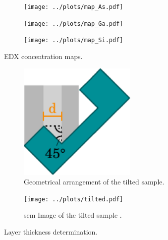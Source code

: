 \begin{figure}[t!]
	\centering
	\begin{subfigure}{0.45\linewidth}
		\centering
		\texttt{[image: ../plots/map\_As.pdf]}
		\caption{ }
		\label{subfig:map_as}
	\end{subfigure}
	\begin{subfigure}{0.45\linewidth}
		\centering
		\texttt{[image: ../plots/map\_Ga.pdf]}
		\caption{ }
		\label{subfig:map_ga}
	\end{subfigure}
	\begin{subfigure}{0.45\linewidth}
		\centering
		\texttt{[image: ../plots/map\_Si.pdf]}
		\caption{ }
		\label{subfig:map_si}
	\end{subfigure}
	\caption{EDX concentration maps.}
	\label{fig:edx_maps}
\end{figure}

\begin{figure}
	\centering
	\begin{subfigure}{0.45\linewidth}
		\centering
		\includegraphics[width=0.625\textwidth]{../assets/angle.pdf}
		\caption{Geometrical arrangement of the tilted sample.}
		\label{fig:layer}
	\end{subfigure}
	\begin{subfigure}{0.45\linewidth}
		\centering
		\texttt{[image: ../plots/tilted.pdf]}
		\caption{\ac{sem} Image of the tilted sample .}
		\label{fig:depth}
	\end{subfigure}
	\caption{Layer thickness determination.}
\end{figure}
	
